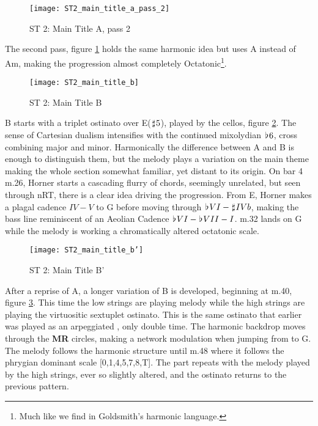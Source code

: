 \begin{figure}[h!]
\center
\texttt{[image: ST2\_main\_title\_a\_pass\_2]}
	\caption{ST 2: Main Title A, pass 2}
	\label{ST2_main_title_a_pass_2}
\end{figure}

The second pass, figure \ref{ST2_main_title_a_pass_2} holds the same harmonic idea but uses A instead of Am, making the progression almost completely Octatonic\footnote{Much like we find in Goldsmith's harmonic language.}. 

\begin{figure}[h!]
\center
\texttt{[image: ST2\_main\_title\_b]}
	\caption{ST 2: Main Title B}
	\label{ST2_main_title_b}
\end{figure}

B starts with a triplet ostinato over E(\(\hspace*{0.18ex}\sharp\hspace*{0.18ex} 5\)), played by the cellos, figure \ref{ST2_main_title_b}. The sense of Cartesian dualism intensifies with the continued mixolydian \(\hspace*{0.18ex}\flat\hspace*{0.18ex}{6}\), cross combining major and minor. Harmonically the difference between A and B is enough to distinguish them, but the melody plays a variation on the main theme making the whole section somewhat familiar, yet distant to its origin. On bar 4 m.26, Horner starts a cascading flurry of chords, seemingly unrelated, but seen through \ac{nRT}, there is a clear idea driving the progression. From E, Horner makes a plagal cadence \(IV-V\) to G before moving through \(\hspace*{0.18ex}\flat\hspace*{0.18ex}{VI}-\hspace*{0.18ex}\sharp\hspace*{0.18ex}{IVb}\), making the bass line reminiscent of an Aeolian Cadence \(\hspace*{0.18ex}\flat\hspace*{0.18ex}{VI}-\hspace*{0.18ex}\flat\hspace*{0.18ex}{VII}-I\). m.32 lands on G while the melody is working a chromatically altered octatonic scale. 

\begin{figure}[h!]
\center
\texttt{[image: ST2\_main\_title\_b']}
	\caption{ST 2: Main Title B'}
	\label{ST2_main_title_b'}
\end{figure}
After a reprise of A, a longer variation of B is developed, beginning at m.40, figure \ref{ST2_main_title_b'}. This time the low strings are playing melody while the high strings are playing the virtuositic sextuplet ostinato. This is the same ostinato that earlier was played as an arpeggiated , only double time. The harmonic backdrop moves through the \textbf{MR} circles, making a network modulation when jumping from \fiss to G. The melody follows the harmonic structure until m.48 where it follows the phrygian dominant scale [0,1,4,5,7,8,T]. The part repeats with the melody  played by the high strings, ever so slightly altered, and the ostinato returns to the previous pattern.

